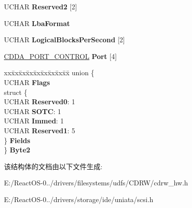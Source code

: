 \begin{DoxyCompactItemize}
\begin{tabbing}
\end{tabbing}\item 
\mbox{\label{struct___m_o_d_e___c_d___a_u_d_i_o___c_o_n_t_r_o_l___p_a_g_e_a75ca0343c54ca1ea5097a3d4006eb066}} 
U\+C\+H\+AR {\bfseries Reserved2} \mbox{[}2\mbox{]}
\item 
\mbox{\label{struct___m_o_d_e___c_d___a_u_d_i_o___c_o_n_t_r_o_l___p_a_g_e_ae55360682ead2eeb8f5486f9a7cab121}} 
U\+C\+H\+AR {\bfseries Lba\+Format}
\item 
\mbox{\label{struct___m_o_d_e___c_d___a_u_d_i_o___c_o_n_t_r_o_l___p_a_g_e_ae96769883ec8b43eb684ae51329dbdc7}} 
U\+C\+H\+AR {\bfseries Logical\+Blocks\+Per\+Second} \mbox{[}2\mbox{]}
\item 
\mbox{\label{struct___m_o_d_e___c_d___a_u_d_i_o___c_o_n_t_r_o_l___p_a_g_e_a02539f6468e97016c9fc3db3c4d2547f}} 
\hyperlink{struct___c_d_d_a___p_o_r_t___c_o_n_t_r_o_l}{C\+D\+D\+A\+\_\+\+P\+O\+R\+T\+\_\+\+C\+O\+N\+T\+R\+OL} {\bfseries Port} \mbox{[}4\mbox{]}
\item 
\mbox{\label{struct___m_o_d_e___c_d___a_u_d_i_o___c_o_n_t_r_o_l___p_a_g_e_a15068fe268b5d63908a2537038db18fb}} 
\begin{tabbing}
xx\=xx\=xx\=xx\=xx\=xx\=xx\=xx\=xx\=\kill
union \{\\
\>UCHAR {\bfseries Flags}\\
\>struct \{\\
\>\>UCHAR {\bfseries Reserved0}: 1\\
\>\>UCHAR {\bfseries SOTC}: 1\\
\>\>UCHAR {\bfseries Immed}: 1\\
\>\>UCHAR {\bfseries Reserved1}: 5\\
\>\} {\bfseries Fields}\\
\} {\bfseries Byte2}\\

\end{tabbing}\end{DoxyCompactItemize}


该结构体的文档由以下文件生成\+:\begin{DoxyCompactItemize}
\item 
E\+:/\+React\+O\+S-\/0../drivers/filesystems/udfs/\+C\+D\+R\+W/cdrw\+\_\+hw.\+h\item 
E\+:/\+React\+O\+S-\/0../drivers/storage/ide/uniata/scsi.\+h\end{DoxyCompactItemize}
